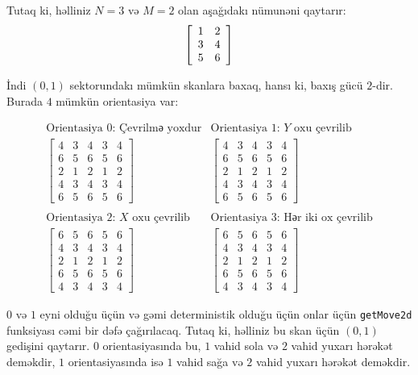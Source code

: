 \documentclass[12pt]{article}
\begin{document}
Tutaq ki, həlliniz $N=3$ və $M=2$ olan aşağıdakı nümunəni qaytarır:
\[
\left[
\begin{array}{c c}
1 & 2 \\
3 & 4 \\
5 & 6
\end{array}
\right]
\]

İndi $(0, 1)$ sektorundakı mümkün skanlara baxaq, hansı ki, baxış gücü $2$-dir. Burada $4$ mümkün orientasiya var:

\[
\begin{array}{cc}
\text{Orientasiya $0$: Çevrilmə yoxdur} & \text{Orientasiya $1$: $Y$ oxu çevrilib} \\
\left[
\begin{array}{ccccc}
4 & 3 & 4 & 3 & 4 \\
6 & 5 & 6 & 5 & 6 \\
2 & 1 & 2 & 1 & 2 \\
4 & 3 & 4 & 3 & 4 \\
6 & 5 & 6 & 5 & 6
\end{array}
\right]
&
\left[
\begin{array}{ccccc}
4 & 3 & 4 & 3 & 4 \\
6 & 5 & 6 & 5 & 6 \\
2 & 1 & 2 & 1 & 2 \\
4 & 3 & 4 & 3 & 4 \\
6 & 5 & 6 & 5 & 6
\end{array}
\right]
\\
\\
\text{Orientasiya $2$: $X$ oxu çevrilib} & \text{Orientasiya $3$: Hər iki ox çevrilib} \\
\left[
\begin{array}{ccccc}
6 & 5 & 6 & 5 & 6 \\
4 & 3 & 4 & 3 & 4 \\
2 & 1 & 2 & 1 & 2 \\
6 & 5 & 6 & 5 & 6 \\
4 & 3 & 4 & 3 & 4
\end{array}
\right]
&
\left[
\begin{array}{ccccc}
6 & 5 & 6 & 5 & 6 \\
4 & 3 & 4 & 3 & 4 \\
2 & 1 & 2 & 1 & 2 \\
6 & 5 & 6 & 5 & 6 \\
4 & 3 & 4 & 3 & 4
\end{array}
\right]
\end{array}
\] 

$0$ və $1$ eyni olduğu üçün və gəmi deterministik olduğu üçün onlar üçün \verb|getMove2d| funksiyası cəmi bir dəfə çağırılacaq. Tutaq ki, həlliniz bu skan üçün $(0, 1)$ gedişini qaytarır. $0$ orientasiyasında bu, $1$ vahid sola və $2$ vahid yuxarı hərəkət deməkdir, $1$ orientasiyasında isə $1$ vahid sağa və $2$ vahid yuxarı hərəkət deməkdir.
\end{document}
